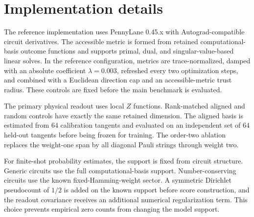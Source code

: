 \section{Implementation details}

The reference implementation uses PennyLane 0.45.x with Autograd-compatible circuit derivatives. The accessible metric is formed from retained computational-basis outcome functions and supports primal, dual, and singular-value-based linear solves. In the reference configuration, metrics are trace-normalized, damped with an absolute coefficient $\lambda=0.003$, refreshed every two optimization steps, and combined with a Euclidean direction cap and an accessible-metric trust radius. These controls are fixed before the main benchmark is evaluated.

The primary physical readout uses local $Z$ functions. Rank-matched aligned and random controls have exactly the same retained dimension. The aligned basis is estimated from 64 calibration tangents and evaluated on an independent set of 64 held-out tangents before being frozen for training. The order-two ablation replaces the weight-one span by all diagonal Pauli strings through weight two.

For finite-shot probability estimates, the support is fixed from circuit structure. Generic circuits use the full computational-basis support. Number-conserving circuits use the known fixed-Hamming-weight sector. A symmetric Dirichlet pseudocount of $1/2$ is added on the known support before score construction, and the readout covariance receives an additional numerical regularization term. This choice prevents empirical zero counts from changing the model support.
